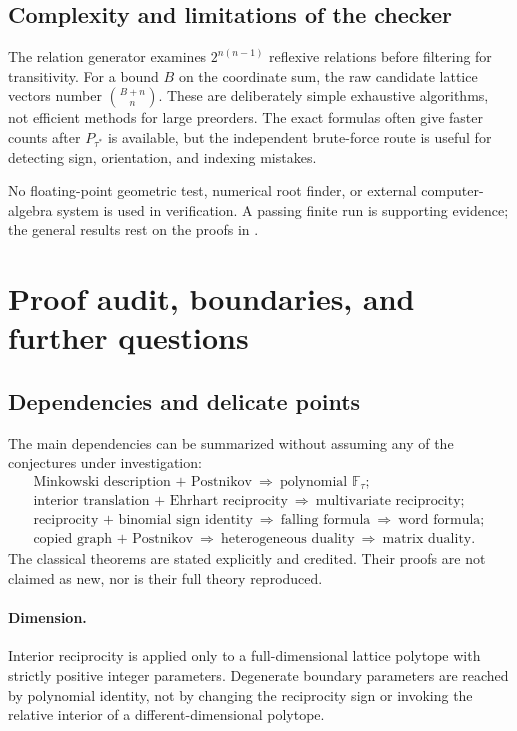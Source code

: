 \documentclass[11pt,letterpaper]{article}
\theoremstyle{definition}
\newcommand{\FF}{\mathbb F}
\begin{document}
\subsection{Complexity and limitations of the checker}
The relation generator examines $2^{n(n-1)}$ reflexive relations before
filtering for transitivity. For a bound $B$ on the coordinate sum, the raw
candidate lattice vectors number $\binom{B+n}{n}$. These are deliberately
simple exhaustive algorithms, not efficient methods for large preorders.
The exact formulas often give faster counts after $P_{\tau^*}$ is available,
but the independent brute-force route is useful for detecting sign,
orientation, and indexing mistakes.

No floating-point geometric test, numerical root finder, or external
computer-algebra system is used in verification. A passing finite run is
supporting evidence; the general results rest on the proofs in
.

\section{Proof audit, boundaries, and further questions}\label{sec:audit}

\subsection{Dependencies and delicate points}
The main dependencies can be summarized without assuming any of the
conjectures under investigation:
\[
 \begin{gathered}
 \text{Minkowski description + Postnikov}
       \ \Longrightarrow\ \text{polynomial }\FF_\tau;\\
 \text{interior translation + Ehrhart reciprocity}
       \ \Longrightarrow\ \text{multivariate reciprocity};\\
 \text{reciprocity + binomial sign identity}
       \ \Longrightarrow\ \text{falling formula}
       \ \Longrightarrow\ \text{word formula};\\
 \text{copied graph + Postnikov}
       \ \Longrightarrow\ \text{heterogeneous duality}
       \ \Longrightarrow\ \text{matrix duality}.
 \end{gathered}
\]
The classical theorems are stated explicitly and credited. Their proofs are
not claimed as new, nor is their full theory reproduced.

\paragraph{Dimension.}
Interior reciprocity is applied only to a full-dimensional lattice polytope
with strictly positive integer parameters. Degenerate boundary parameters
are reached by polynomial identity, not by changing the reciprocity sign
or invoking the relative interior of a different-dimensional polytope.
\end{document}
